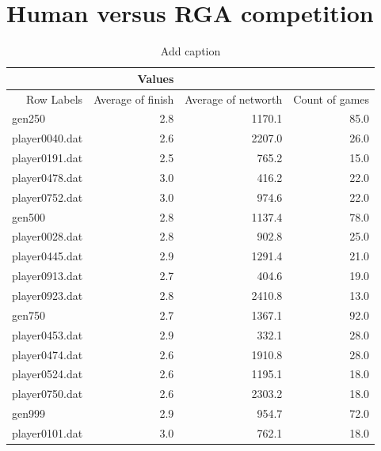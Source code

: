 \section{Human versus RGA competition}
      \begin{table}[htbp]
        \centering
        \caption{Add caption}
          \begin{tabular}{rrrr}
          \toprule
                 & Values &        &  \\
          \midrule
          Row Labels & Average of finish & Average of networth & Count of games \\
          \multicolumn{1}{l}{gen250} & 2.8    & 1170.1 & 85.0 \\
          \hline
          \multicolumn{1}{l}{player0040.dat} & 2.6    & 2207.0 & 26.0 \\
          \multicolumn{1}{l}{player0191.dat} & 2.5    & 765.2  & 15.0 \\
          \multicolumn{1}{l}{player0478.dat} & 3.0    & 416.2  & 22.0 \\
          \multicolumn{1}{l}{player0752.dat} & 3.0    & 974.6  & 22.0 \\
          \multicolumn{1}{l}{gen500} & 2.8    & 1137.4 & 78.0 \\
          \hline
          \multicolumn{1}{l}{player0028.dat} & 2.8    & 902.8  & 25.0 \\
          \multicolumn{1}{l}{player0445.dat} & 2.9    & 1291.4 & 21.0 \\
          \multicolumn{1}{l}{player0913.dat} & 2.7    & 404.6  & 19.0 \\
          \multicolumn{1}{l}{player0923.dat} & 2.8    & 2410.8 & 13.0 \\
          \multicolumn{1}{l}{gen750} & 2.7    & 1367.1 & 92.0 \\
          \hline
          \multicolumn{1}{l}{player0453.dat} & 2.9    & 332.1  & 28.0 \\
          \multicolumn{1}{l}{player0474.dat} & 2.6    & 1910.8 & 28.0 \\
          \multicolumn{1}{l}{player0524.dat} & 2.6    & 1195.1 & 18.0 \\
          \multicolumn{1}{l}{player0750.dat} & 2.6    & 2303.2 & 18.0 \\
          \multicolumn{1}{l}{gen999} & 2.9    & 954.7  & 72.0 \\
          \hline
          \multicolumn{1}{l}{player0101.dat} & 3.0    & 762.1  & 18.0 \\

\end{tabular}
\end{table}
